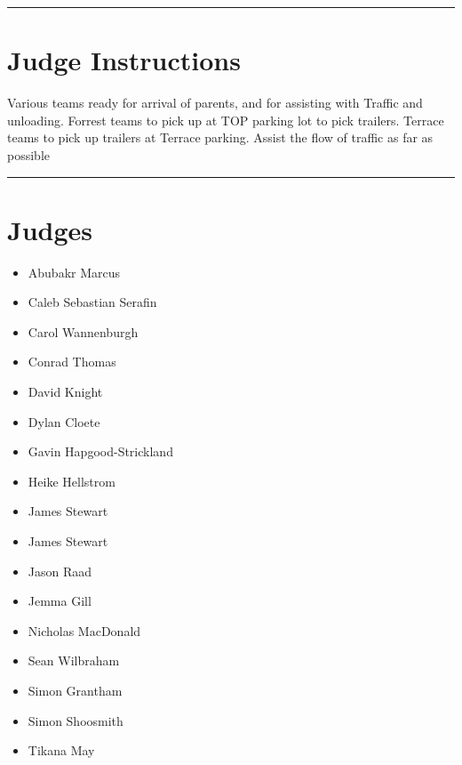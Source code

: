 \documentclass[10pt]{article}
\begin{document}
	\vspace{0.5cm}
	\hrule
	\vspace{0.5cm}

		\section*{Judge Instructions}
		Various teams ready for arrival of parents, and for assisting with Traffic and unloading. Forrest teams to pick up at TOP parking lot to pick trailers. Terrace teams to pick up trailers at Terrace parking. Assist the flow of traffic as far as possible
\vspace{0.5cm}
	\hrule
	\vspace{0.5cm}
		\section*{\faUsers \: Judges}

		

	\begin{multicols}{2}

		\begin{itemize}
									\item Abubakr Marcus
									\item Caleb Sebastian Serafin
									\item Carol Wannenburgh
									\item Conrad Thomas
									\item David Knight
									\item Dylan Cloete
									\item Gavin Hapgood-Strickland
									\item Heike Hellstrom
									\item James Stewart
						\end{itemize}

		\vfill\null
		\columnbreak

		\begin{itemize}
									\item James Stewart
									\item Jason Raad
									\item Jemma Gill
									\item Nicholas MacDonald
									\item Sean Wilbraham
									\item Simon Grantham
									\item Simon Shoosmith
									\item Tikana May
						\end{itemize}

		\vfill\null

		\end{multicols}
\end{document}

